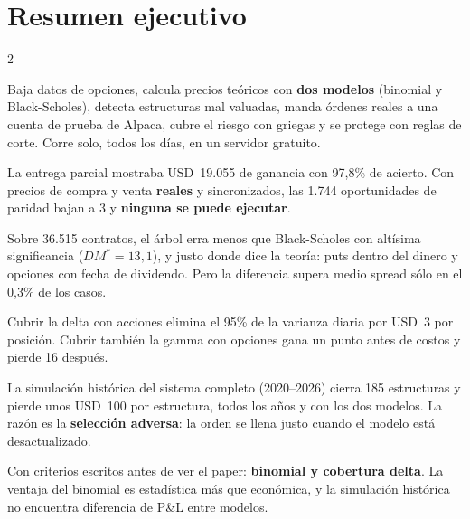 \documentclass[11pt,a4paper]{article}
\newcommand{\usd}[1]{USD~#1}
\begin{document}
\tableofcontents
\thispagestyle{fancy}
\newpage

\section{Resumen ejecutivo}

\begin{multicols}{2}
\begin{idea}
Baja datos de opciones, calcula precios teóricos con \textbf{dos modelos} (binomial y Black-Scholes), detecta
estructuras mal valuadas, manda órdenes reales a una cuenta de prueba de Alpaca, cubre el riesgo con griegas y se
protege con reglas de corte. Corre solo, todos los días, en un servidor gratuito.
\end{idea}

\begin{idea}
La entrega parcial mostraba \usd{19.055} de ganancia con 97,8\% de acierto. Con precios de compra y venta
\textbf{reales} y sincronizados, las 1.744 oportunidades de paridad bajan a 3 y \textbf{ninguna se puede ejecutar}.
\end{idea}

\begin{idea}
Sobre 36.515 contratos, el árbol erra menos que Black-Scholes con altísima significancia ($DM^*=13{,}1$), y justo
donde dice la teoría: puts dentro del dinero y opciones con fecha de dividendo. Pero la diferencia supera medio
spread sólo en el 0,3\% de los casos.
\end{idea}

\begin{idea}
Cubrir la delta con acciones elimina el 95\% de la varianza diaria por \usd{3} por posición. Cubrir también la
gamma con opciones gana un punto antes de costos y pierde 16 después.
\end{idea}

\begin{idea}
La simulación histórica del sistema completo (2020–2026) cierra 185 estructuras y pierde unos \usd{100} por
estructura, todos los años y con los dos modelos. La razón es la \textbf{selección adversa}: la orden se llena
justo cuando el modelo está desactualizado.
\end{idea}

\begin{idea}[6 · Decisión]
Con criterios escritos antes de ver el paper: \textbf{binomial y cobertura delta}. La ventaja del binomial es
estadística más que económica, y la simulación histórica no encuentra diferencia de P\&L entre modelos.
\end{idea}
\end{multicols}
\end{document}
